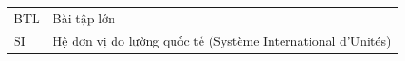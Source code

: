 {\setlength{\parskip}{6pt}
\begin{tabular}{@{}ll@{}}
BTL   & Bài tập lớn \\
SI    & Hệ đơn vị đo lường quốc tế (Système International d'Unités) \\
\end{tabular}\par}
